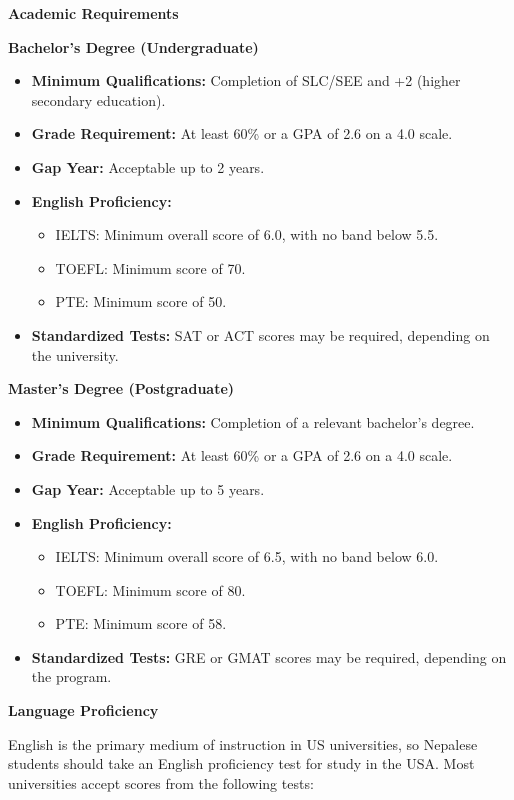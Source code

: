 \textbf{Academic Requirements}

\textbf{Bachelor’s Degree (Undergraduate)}
\begin{itemize}
    \item \textbf{Minimum Qualifications:} Completion of SLC/SEE and +2 (higher secondary education).
    \item \textbf{Grade Requirement:} At least 60\% or a GPA of 2.6 on a 4.0 scale.
    \item \textbf{Gap Year:} Acceptable up to 2 years.
    \item \textbf{English Proficiency:}
    \begin{itemize}
        \item IELTS: Minimum overall score of 6.0, with no band below 5.5.
        \item TOEFL: Minimum score of 70.
        \item PTE: Minimum score of 50.
    \end{itemize}
    \item \textbf{Standardized Tests:} SAT or ACT scores may be required, depending on the university.
\end{itemize}

\textbf{Master’s Degree (Postgraduate)}
\begin{itemize}
    \item \textbf{Minimum Qualifications:} Completion of a relevant bachelor’s degree.
    \item \textbf{Grade Requirement:} At least 60\% or a GPA of 2.6 on a 4.0 scale.
    \item \textbf{Gap Year:} Acceptable up to 5 years.
    \item \textbf{English Proficiency:}
    \begin{itemize}
        \item IELTS: Minimum overall score of 6.5, with no band below 6.0.
        \item TOEFL: Minimum score of 80.
        \item PTE: Minimum score of 58.
    \end{itemize}
    \item \textbf{Standardized Tests:} GRE or GMAT scores may be required, depending on the program.
\end{itemize}

\textbf{Language Proficiency}

English is the primary medium of instruction in US universities, so Nepalese students should take an English proficiency test for study in the USA. Most universities accept scores from the following tests:

